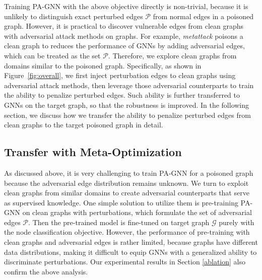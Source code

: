 \documentclass[sigconf]{acmart}
\newcommand{\ours}{{PA-GNN}\xspace}
\def \G {\mathcal{G}}
\def \P {\mathcal{P}}
\begin{document}
Training \ours with the above objective directly is non-trivial, because it is unlikely to distinguish exact perturbed edges $\P$ from normal edges in a poisoned graph. However, it is practical to discover vulnerable edges from clean graphs with adversarial attack methods on graphs. 
For example, \textit{metattack} poisons a clean graph to reduces the performance of GNNs by adding adversarial edges, which can be treated as the set $\P$.
Therefore, we explore clean graphs from domains similar to the poisoned graph.
Specifically, as shown in Figure~\ref{fig:overall}, we first inject perturbation edges to clean graphs using adversarial attack methods, then leverage those adversarial counterparts to train the ability to penalize perturbed edges. 
Such ability is further transferred to GNNs on the target graph, so that the robustness is improved.
In the following section, we discuss how we transfer the ability to penalize perturbed edges from clean graphs to the target poisoned graph in detail.


\subsection{Transfer with Meta-Optimization} \label{meta_optim}
As discussed above, it is very challenging to train \ours for a poisoned graph because the adversarial edge distribution remains unknown.
We turn to exploit clean graphs from similar domains to create adversarial counterparts that serve as supervised knowledge.
One simple solution to utilize them is pre-training \ours on clean graphs with perturbations, which formulate the set of adversarial edges $\P$. Then the pre-trained model is fine-tuned on target graph $\G$ purely with the node classification objective.
However, the performance of pre-training with clean graphs and adversarial edges is rather limited, because graphs have different data distributions, making it difficult to equip GNNs with a generalized ability to discriminate perturbations. 
Our experimental results in Section \ref{ablation} also confirm the above analysis.
\end{document}
